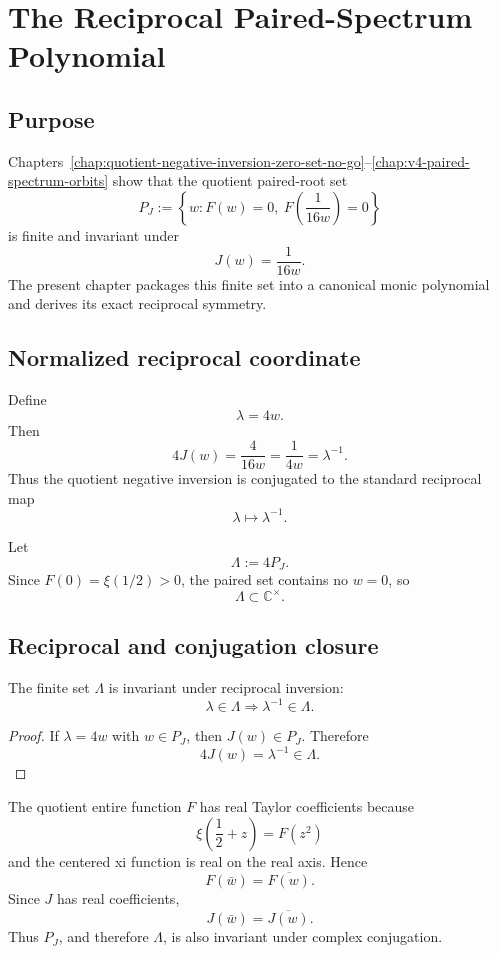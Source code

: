 \chapter{The Reciprocal Paired-Spectrum Polynomial}
\label{chap:reciprocal-paired-spectrum-polynomial}


\section{Purpose}

Chapters~\ref{chap:quotient-negative-inversion-zero-set-no-go}--\ref{chap:v4-paired-spectrum-orbits} show that the quotient paired-root set
\[
 P_J:=\left\{w:F(w)=0,\ F\!\left(\frac1{16w}\right)=0\right\}
\]
is finite and invariant under
\[
 J(w)=\frac1{16w}.
\]
The present chapter packages this finite set into a canonical monic polynomial and derives its exact reciprocal symmetry.

\section{Normalized reciprocal coordinate}

Define
\[
 \lambda=4w.
\]
Then
\[
 4J(w)=\frac4{16w}=\frac1{4w}=\lambda^{-1}.
\]
Thus the quotient negative inversion is conjugated to the standard reciprocal map
\[
 \boxed{\lambda\mapsto\lambda^{-1}}.
\]

Let
\[
 \Lambda:=4P_J.
\]
Since $F(0)=\xi(1/2)>0$, the paired set contains no $w=0$, so
\[
 \Lambda\subset\mathbb C^\times.
\]

\section{Reciprocal and conjugation closure}

\begin{proposition}
The finite set $\Lambda$ is invariant under reciprocal inversion:
\[
 \lambda\in\Lambda\Longrightarrow\lambda^{-1}\in\Lambda.
\]
\end{proposition}

\begin{proof}
If $\lambda=4w$ with $w\in P_J$, then $J(w)\in P_J$.  Therefore
\[
 4J(w)=\lambda^{-1}\in\Lambda.
\]
\end{proof}

The quotient entire function $F$ has real Taylor coefficients because
\[
 \xi\!\left(\frac12+z\right)=F(z^2)
\]
and the centered xi function is real on the real axis. Hence
\[
 F(\bar w)=\overline{F(w)}.
\]
Since $J$ has real coefficients,
\[
 J(\bar w)=\overline{J(w)}.
\]
Thus $P_J$, and therefore $\Lambda$, is also invariant under complex conjugation.

